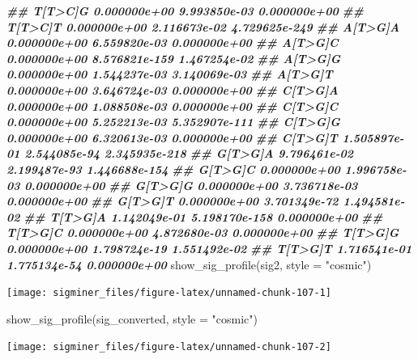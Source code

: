 \documentclass[
  12pt,
  a4paper,
  twoside]{book}
\newenvironment{Shaded}{\begin{snugshade}}{\end{snugshade}}
\newcommand{\AttributeTok}[1]{\textcolor[rgb]{0.77,0.63,0.00}{#1}}
\newcommand{\DocumentationTok}[1]{\textcolor[rgb]{0.56,0.35,0.01}{\textbf{\textit{#1}}}}
\newcommand{\FunctionTok}[1]{\textcolor[rgb]{0.00,0.00,0.00}{#1}}
\newcommand{\NormalTok}[1]{#1}
\newcommand{\StringTok}[1]{\textcolor[rgb]{0.31,0.60,0.02}{#1}}
\begin{document}
\begin{Shaded}
\begin{Highlighting}[]
\DocumentationTok{\#\# T[T\textgreater{}C]G  0.000000e+00  9.993850e{-}03  0.000000e+00}
\DocumentationTok{\#\# T[T\textgreater{}C]T  0.000000e+00  2.116673e{-}02 4.729625e{-}249}
\DocumentationTok{\#\# A[T\textgreater{}G]A  0.000000e+00  6.559820e{-}03  0.000000e+00}
\DocumentationTok{\#\# A[T\textgreater{}G]C  0.000000e+00 8.576821e{-}159  1.467254e{-}02}
\DocumentationTok{\#\# A[T\textgreater{}G]G  0.000000e+00  1.544237e{-}03  3.140069e{-}03}
\DocumentationTok{\#\# A[T\textgreater{}G]T  0.000000e+00  3.646724e{-}03  0.000000e+00}
\DocumentationTok{\#\# C[T\textgreater{}G]A  0.000000e+00  1.088508e{-}03  0.000000e+00}
\DocumentationTok{\#\# C[T\textgreater{}G]C  0.000000e+00  5.252213e{-}03 5.352907e{-}111}
\DocumentationTok{\#\# C[T\textgreater{}G]G  0.000000e+00  6.320613e{-}03  0.000000e+00}
\DocumentationTok{\#\# C[T\textgreater{}G]T  1.505897e{-}01  2.544085e{-}94 2.345935e{-}218}
\DocumentationTok{\#\# G[T\textgreater{}G]A  9.796461e{-}02  2.199487e{-}93 1.446688e{-}154}
\DocumentationTok{\#\# G[T\textgreater{}G]C  0.000000e+00  1.996758e{-}03  0.000000e+00}
\DocumentationTok{\#\# G[T\textgreater{}G]G  0.000000e+00  3.736718e{-}03  0.000000e+00}
\DocumentationTok{\#\# G[T\textgreater{}G]T  0.000000e+00  3.701349e{-}72  1.494581e{-}02}
\DocumentationTok{\#\# T[T\textgreater{}G]A  1.142049e{-}01 5.198170e{-}158  0.000000e+00}
\DocumentationTok{\#\# T[T\textgreater{}G]C  0.000000e+00  4.872680e{-}03  0.000000e+00}
\DocumentationTok{\#\# T[T\textgreater{}G]G  0.000000e+00  1.798724e{-}19  1.551492e{-}02}
\DocumentationTok{\#\# T[T\textgreater{}G]T  1.716541e{-}01  1.775134e{-}54  0.000000e+00}
\FunctionTok{show\_sig\_profile}\NormalTok{(sig2, }\AttributeTok{style =} \StringTok{"cosmic"}\NormalTok{)}
\end{Highlighting}
\end{Shaded}

\texttt{[image: sigminer\_files/figure-latex/unnamed-chunk-107-1]}

\begin{Shaded}
\begin{Highlighting}[]
\FunctionTok{show\_sig\_profile}\NormalTok{(sig\_converted, }\AttributeTok{style =} \StringTok{"cosmic"}\NormalTok{)}
\end{Highlighting}
\end{Shaded}

\texttt{[image: sigminer\_files/figure-latex/unnamed-chunk-107-2]}

\hypertarget{appendix-appendix}{%
\appendix {}}


  
\end{document}
